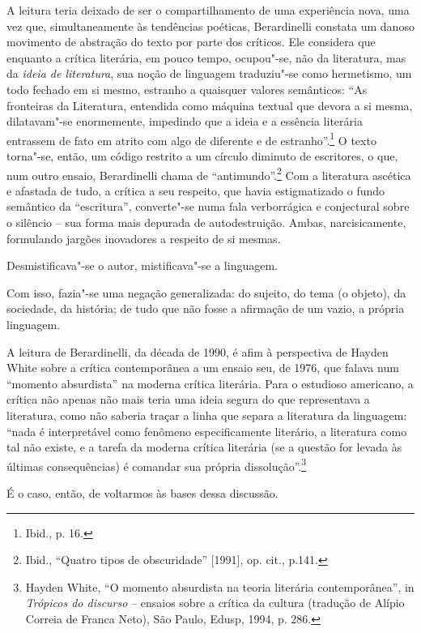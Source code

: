 A leitura teria deixado de ser o compartilhamento de uma experiência
nova, uma vez que, simultaneamente às tendências poéticas, Berardinelli
constata um danoso movimento de abstração do texto por parte dos
críticos. Ele considera que enquanto a crítica literária, em pouco
tempo, ocupou"-se, não da literatura, mas da \emph{ideia de literatura}, sua
noção de linguagem traduziu"-se como hermetismo, um todo fechado em si
mesmo, estranho a quaisquer valores semânticos: ``As fronteiras da
Literatura, entendida como máquina textual que devora a si mesma,
dilatavam"-se enormemente, impedindo que a ideia e a essência literária
entrassem de fato em atrito com algo de diferente e de
estranho''.\footnote{Ibid., p. 16.} O texto torna"-se, então, um código
restrito a um círculo diminuto de escritores, o que, num outro ensaio,
Berardinelli chama de ``antimundo''.\footnote{Ibid., ``Quatro tipos de
  obscuridade'' [1991], op. cit., p.141.} Com a literatura ascética
e afastada de tudo, a crítica a seu respeito, que havia estigmatizado o
fundo semântico da ``escritura'', converte"-se numa fala verborrágica e
conjectural sobre o silêncio -- sua forma mais depurada de
autodestruição. Ambas, narcisicamente, formulando jargões inovadores a
respeito de si mesmas.

Desmistificava"-se o autor, mistificava"-se a linguagem.

Com isso, fazia"-se uma negação generalizada: do sujeito, do tema (o
objeto), da sociedade, da história; de tudo que não fosse a afirmação de
um vazio, a própria linguagem.

A leitura de Berardinelli, da década de 1990, é afim à perspectiva de
Hayden White sobre a crítica contemporânea a um ensaio seu, de 1976, que
falava num ``momento absurdista'' na moderna crítica literária. Para o
estudioso americano, a crítica não apenas não mais teria uma ideia
segura do que representava a literatura, como não saberia traçar a linha
que separa a literatura da linguagem: ``nada é interpretável como
fenômeno especificamente literário, a literatura como tal não existe, e
a tarefa da moderna crítica literária (se a questão for levada às
últimas consequências) é comandar sua própria dissolução''.\footnote{Hayden
  White, ``O momento absurdista na teoria literária contemporânea'', in
  \emph{Trópicos do discurso} -- ensaios sobre a crítica da cultura
  (tradução de Alípio Correia de Franca Neto), São Paulo, Edusp, 1994,
  p. 286.}

É o caso, então, de voltarmos às bases dessa discussão.

